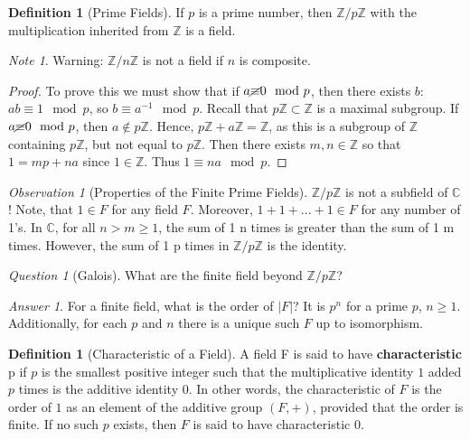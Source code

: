 \documentclass[12pt]{article}
\theoremstyle{definition}
\newtheorem{defn}[thm]{Definition}
\theoremstyle{remark}
\newtheorem*{qst}{Question}
\newtheorem*{ans}{Answer}
\newtheorem{obs}[thm]{Observation}
\newtheorem*{note}{Note} %
\numberwithin{equation}{section}
\newcommand\C{\mathbb C}    %
\newcommand\Z{\mathbb Z}    %
\newcommand\B[1]{\textbf{ #1}}
\begin{document}
\vspace{15pt}

\begin{defn}[Prime Fields]
        If $p$ is a prime number, then $\Z/p\Z$ with the multiplication inherited from $\Z$ is a field.
\end{defn}
\begin{note}
        Warning: $\Z/n\Z$ is not a field if $n$ is composite.
\end{note}
\begin{proof}
        To prove this we must show that if $a \cancel{\equiv} 0 \mod p$, then there exists $b$: $ab \equiv 1 \mod p$, so $b \equiv a^{-1} \mod p$. Recall that $p\Z \subset \Z$ is a maximal subgroup. If $a \cancel{\equiv} 0 \mod p$, then $a \notin p\Z$. Hence, $p\Z + a\Z = \Z$, as this is a subgroup of $\Z$ containing $p\Z$, but not equal to $p\Z$. Then there exists $m,n \in \Z$ so that $1 = mp + na$ since $1 \in \Z$. Thus $1 \equiv na \mod p$.
\end{proof}

\vspace{15pt}

\begin{obs}[Properties of the Finite Prime Fields]
        $\Z/p\Z$ is not a subfield of $\C$! Note, that $1 \in F$ for any field $F$. Moreover, $1+1+...+1 \in F$ for any number of 1's. In $\C$, for all $n > m \geq 1$, the sum of 1 n times is greater than the sum of 1 m times. However, the sum of 1 p times in $\Z/p\Z$ is the identity.
\end{obs}

\vspace{15pt}

\begin{qst}[Galois]
        What are the finite field beyond $\Z/p\Z$?
\end{qst}
\begin{ans}
        For a finite field, what is the order of $|F|$? It is $p^n$ for a prime $p$, $n \geq 1$. Additionally, for each $p$ and $n$ there is a unique such $F$ up to isomorphism.
\end{ans}


\vspace{15pt}
\begin{defn}[Characteristic of a Field]
        A field F is said to have \B{characteristic} p if $p$ is the smallest positive integer such that the multiplicative identity $1$ added $p$ times is the additive identity $0$. In other words, the characteristic of $F$ is the order of $1$ as an element of the additive group $(F,+)$, provided that the order is finite. If no such $p$ exists, then $F$ is said to have characteristic $0$.
\end{defn}
\end{document}
